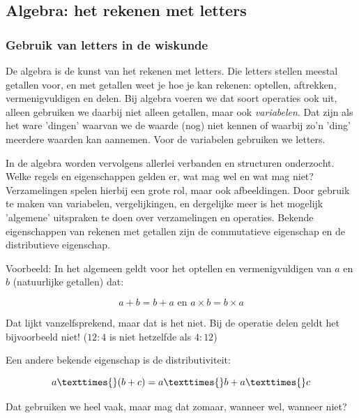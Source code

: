 \subsection{Algebra: het rekenen met letters}


\subsubsection{Gebruik van letters in de wiskunde}

De algebra is de kunst van het rekenen met letters. Die letters stellen
meestal getallen voor, en met getallen weet je hoe je kan rekenen:
optellen, aftrekken, vermenigvuldigen en delen. Bij algebra voeren
we dat soort operaties ook uit, alleen gebruiken we daarbij niet alleen
getallen, maar ook \emph{variabelen}. Dat zijn als het ware 'dingen'
waarvan we de waarde (nog) niet kennen of waarbij zo'n 'ding' meerdere
waarden kan aannemen. Voor de variabelen gebruiken we letters.

\noindent In de algebra worden vervolgens allerlei verbanden en structuren
onderzocht. Welke regels en eigenschappen gelden er, wat mag wel en
wat mag niet? Verzamelingen spelen hierbij een grote rol, maar ook
afbeeldingen. Door gebruik te maken van variabelen, vergelijkingen,
en dergelijke meer is het mogelijk 'algemene' uitspraken te doen over
verzamelingen en operaties. Bekende eigenschappen van rekenen met
getallen zijn de commutatieve eigenschap en de distributieve eigenschap.

\medskip{}

Voorbeeld: In het algemeen geldt voor het optellen en vermenigvuldigen
van $a$ en $b$ (natuurlijke getallen) dat:

\begin{equation*}
a + b = b + a \text{ en } a \times{} b = b \times{} a
\end{equation*}

Dat lijkt vanzelfsprekend, maar dat is het niet. Bij de operatie delen
geldt het bijvoorbeeld niet! ($12:4$ is niet hetzelfde als $4:12$)

\medskip{}

Een andere bekende eigenschap is de distributiviteit:

\begin{equation*}
a \texttimes{} (b + c) = a \texttimes{} b + a \texttimes{} c
\end{equation*}

Dat gebruiken we heel vaak, maar mag dat zomaar, wanneer wel, wanneer
niet?

